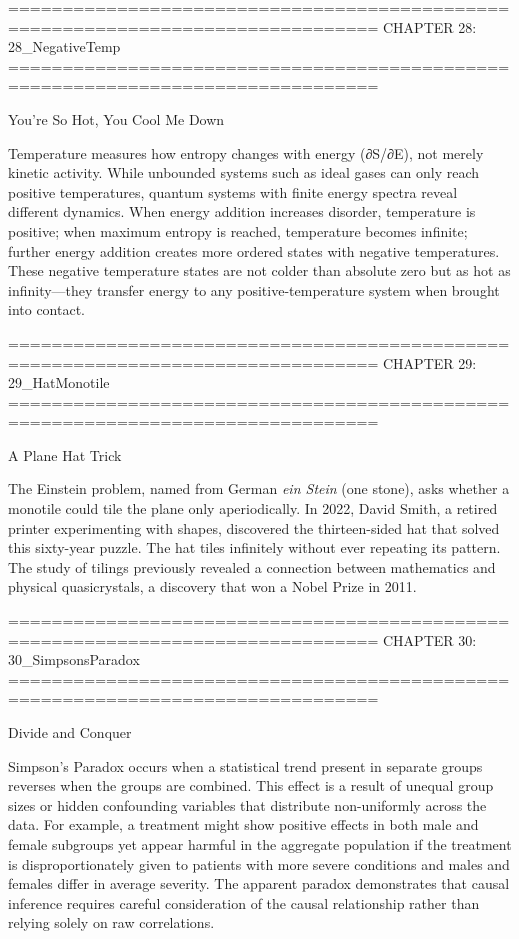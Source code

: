 ================================================================================
CHAPTER 28: 28_NegativeTemp
================================================================================

You're So Hot, You Cool Me Down

Temperature measures how entropy changes with energy (∂S/∂E), not merely kinetic activity. While unbounded systems such as ideal gases can only reach positive temperatures, quantum systems with finite energy spectra reveal different dynamics. When energy addition increases disorder, temperature is positive; when maximum entropy is reached, temperature becomes infinite; further energy addition creates more ordered states with negative temperatures. These negative temperature states are not colder than absolute zero but as hot as infinity—they transfer energy to any positive-temperature system when brought into contact.


================================================================================
CHAPTER 29: 29_HatMonotile
================================================================================

A Plane Hat Trick

The \QSOpen{}Einstein problem\QSClose{}, named from German \textit{\QSOpen{}ein Stein\QSClose{}} (one stone), asks whether a monotile could tile the plane only aperiodically. In 2022, David Smith, a retired printer experimenting with shapes, discovered the thirteen-sided \QSOpen{}hat\QSClose{} that solved this sixty-year puzzle. The hat tiles infinitely without ever repeating its pattern. The study of tilings previously revealed a connection between mathematics and physical quasicrystals, a discovery that won a Nobel Prize in 2011.


================================================================================
CHAPTER 30: 30_SimpsonsParadox
================================================================================

Divide and Conquer

Simpson's Paradox occurs when a statistical trend present in separate groups reverses when the groups are combined. This effect is a result of unequal group sizes or hidden confounding variables that distribute non-uniformly across the data. For example, a treatment might show positive effects in both male and female subgroups yet appear harmful in the aggregate population if the treatment is disproportionately given to patients with more severe conditions and males and females differ in average severity. The apparent paradox demonstrates that causal inference requires careful consideration of the causal relationship rather than relying solely on raw correlations.



